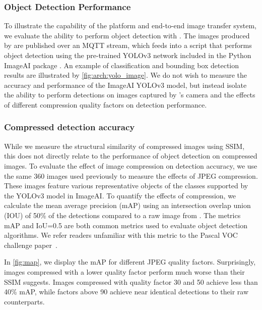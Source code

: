 
\subsubsection{Object Detection Performance}
To illustrate the capability of the platform and end-to-end image transfer system, we evaluate the ability to perform object detection with \name. The images produced by \name are published over an MQTT stream, which feeds into a script that performs object detection using the pre-trained YOLOv3 network included in the Python ImageAI package \cite{ImageAI}. 
An example of classification and bounding box detection results are illustrated by \cref{fig:arch:yolo_image}.
We do not wish to measure the accuracy and performance of the ImageAI YOLOv3 model, but instead isolate the ability to perform detections on images captured by \name's camera and the effects of different compression quality factors on detection performance.


\subsubsection{Compressed detection accuracy}
While we measure the structural similarity of compressed images using SSIM, this does not directly relate to the performance of object detection on compressed images. To evaluate the effect of image compression on detection accuracy, we use the same 360 images used previously to measure the effects of JPEG compression. These images feature various representative objects of the classes supported by the YOLOv3 model in ImageAI. To quantify the effects of compression, we calculate the mean average precision (mAP) using an intersection overlap union (IOU) of 50\% of the detections compared to a raw image from \name. 
The metrics mAP and IoU=0.5 are both common metrics used to evaluate object detection algorithms. We refer readers unfamiliar with this metric to the Pascal VOC challenge paper~\cite{everingham2010pascal}.

In \cref{fig:map}, we display the mAP for different JPEG quality factors. Surprisingly, images compressed with a lower quality factor perform much worse than their SSIM suggests. Images compressed with quality factor 30 and 50 achieve less than 40\% mAP, while factors above 90 achieve near identical detections to their raw counterparts.

